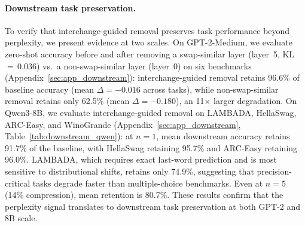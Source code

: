 \documentclass{article}
\begin{document}
\paragraph{Downstream task preservation.}
To verify that interchange-guided removal preserves task performance beyond perplexity, we present evidence at two scales. On GPT-2-Medium, we evaluate zero-shot accuracy before and after removing a swap-similar layer (layer~5, KL\,$=$\,0.036) vs.\ a non-swap-similar layer (layer~0) on six benchmarks (Appendix~\ref{sec:app_downstream}): interchange-guided removal retains 96.6\% of baseline accuracy (mean $\Delta{=}-0.016$ across tasks), while non-swap-similar removal retains only 62.5\% (mean $\Delta{=}-0.180$), an 11$\times$ larger degradation. On Qwen3-8B, we evaluate interchange-guided removal on LAMBADA, HellaSwag, ARC-Easy, and WinoGrande (Appendix~\ref{sec:app_downstream}, Table~\ref{tab:downstream_qwen}): at $n{=}1$, mean downstream accuracy retains 91.7\% of the baseline, with HellaSwag retaining 95.7\% and ARC-Easy retaining 96.0\%. LAMBADA, which requires exact last-word prediction and is most sensitive to distributional shifts, retains only 74.9\%, suggesting that precision-critical tasks degrade faster than multiple-choice benchmarks. Even at $n{=}5$ (14\% compression), mean retention is 80.7\%. These results confirm that the perplexity signal translates to downstream task preservation at both GPT-2 and 8B scale.
\end{document}
